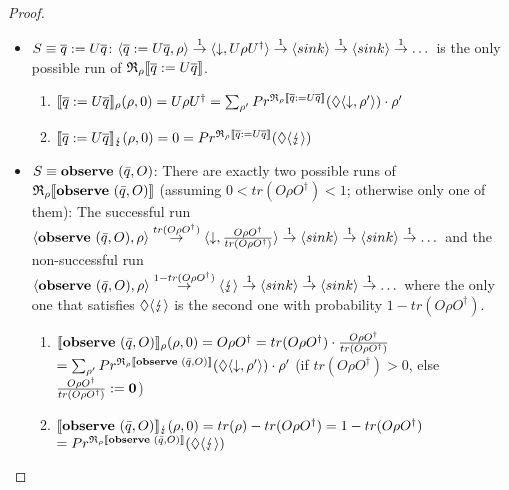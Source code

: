 \documentclass[a4paper,UKenglish,cleveref, autoref, thm-restate]{lipics-v2021}
\begin{document}
\begin{proof}
\begin{enumerate}
\begin{itemize}
        \item $S \equiv \overline{q}:= U\overline{q}$: $\langle \overline{q}:= U\overline{q} , \rho \rangle \overset{1}{\rightarrow} \langle \downarrow , U\rho U^\dagger \rangle \overset{1}{\rightarrow} \langle sink \rangle \overset{1}{\rightarrow} \langle sink \rangle \overset{1}{\rightarrow}  \dots$ is the only possible run of $\mathfrak{R}_{\rho}\llbracket \overline{q}:= U\overline{q} \rrbracket$.

        \begin{enumerate}
            \item $\llbracket \overline{q}:= U\overline{q} \rrbracket_{\rho}(\rho,0) =  U\rho U^\dagger = \sum_{\rho'} Pr^{\mathfrak{R}_{\rho}\llbracket \overline{q}:= U\overline{q} \rrbracket}(\lozenge \langle \downarrow , \rho' \rangle) \cdot \rho'$
        \item $\llbracket \overline{q}:= U\overline{q} \rrbracket_{\lightning}(\rho,0) = 0= Pr^{\mathfrak{R}_{\rho}\llbracket \overline{q}:= U\overline{q} \rrbracket}(\lozenge \langle \lightning \rangle)$
        \end{enumerate}

        \item $S \equiv \mathbf{observe } \text{ }(\Bar{q},O)$: There are exactly two possible runs of $\mathfrak{R}_{\rho}\llbracket \mathbf{observe } \text{ }(\Bar{q},O) \rrbracket$ (assuming $0<tr(O\rho O^\dagger)<1$; otherwise only one of them): The successful run $\langle \mathbf{observe } \text{ }(\Bar{q},O) , \rho \rangle \overset{tr(O \rho O ^\dagger)}{\rightarrow} \langle \downarrow , \frac{O\rho O^\dagger}{tr(O\rho O^\dagger)} \rangle \overset{1}{\rightarrow} \langle sink \rangle \overset{1}{\rightarrow} \langle sink \rangle \overset{1}{\rightarrow}  \dots$ and the non-successful run $\langle \mathbf{observe } \text{ }(\Bar{q},O) , \rho \rangle \overset{1- tr(O \rho O ^\dagger)}{\rightarrow} \langle \lightning \rangle \overset{1}{\rightarrow} \langle sink \rangle \overset{1}{\rightarrow} \langle sink \rangle \overset{1}{\rightarrow}  \dots$ where the only one that satisfies $\lozenge \langle \lightning \rangle$ is the second one with probability $1- tr(O \rho O ^\dagger)$.
        \begin{enumerate}
            \item $\llbracket \mathbf{observe } \text{ }(\Bar{q},O) \rrbracket_{\rho}(\rho,0) =  O\rho O^\dagger = tr(O\rho O^\dagger) \cdot \frac{O\rho O^\dagger}{tr(O\rho O^\dagger)}$\\
            $= \sum_{\rho'} Pr^{\mathfrak{R}_{\rho}\llbracket \mathbf{observe } \text{ }(\Bar{q},O) \rrbracket}(\lozenge \langle \downarrow , \rho' \rangle) \cdot \rho'$ (if $tr(O\rho O^\dagger)>0$, else $\frac{O\rho O^\dagger}{tr(O\rho O^\dagger)}:= \mathbf{0}$)
        \item$\llbracket \mathbf{observe } \text{ }(\Bar{q},O) \rrbracket_{\lightning}(\rho,0) = tr(\rho)-tr(O\rho O^\dagger) = 1- tr(O \rho O ^\dagger)$\\
            $=  Pr^{\mathfrak{R}_{\rho}\llbracket \mathbf{observe } \text{ }(\Bar{q},O) \rrbracket}(\lozenge \langle \lightning \rangle)$
    \end{enumerate}



\end{itemize}
\end{enumerate}
\end{proof}
\end{document}
